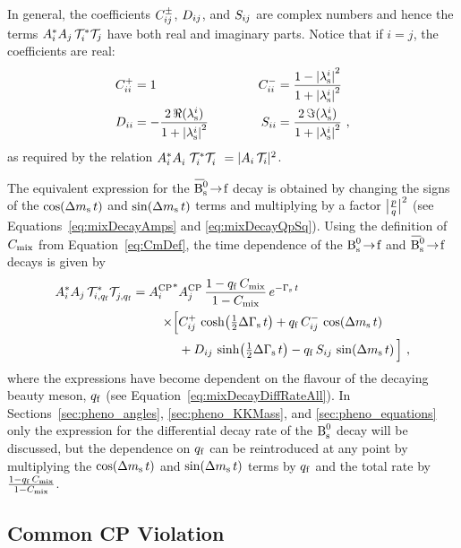 In general, the coefficients $\Cf[ij]^\pm$, $\Df[ij]$, and $\Sf[ij]$ are complex numbers and hence the terms
$\Ai^*\Ai[j]\,\timeAmp^*\timeAmp[j]$ have both real and imaginary parts. Notice that if $i=j$, the coefficients are real:
\begin{equation}
  \begin{alignedat}{2}
    \Cf[ii]^+ &= 1                                                    &  \Cf[ii]^- &= \frac{1-\lamsiSq}{1+\lamsiSq} \\
    \Df[ii]   &= -\frac{2\,\Re(\lamsi)}{1+\lamsiSq} \qquad\qquad  &  \Sf[ii]   &= \frac{2\,\Im(\lamsi)}{1+\lamsiSq} \ ,
  \end{alignedat}
\end{equation}
as required by the relation $\Ai^*\Ai^{\phantom{*}}\,\timeAmp^*\timeAmp^{\phantom{*}} = |\Ai\,\timeAmp|^2$.

The equivalent expression for the $\Bsbartof$ decay is obtained by changing the signs of the $\cDms$ and $\sDms$ terms and multiplying by a
factor $\pqAbsAlt^\text{2}$ (see Equations~\ref{eq:mixDecayAmps} and \ref{eq:mixDecayQpSq}). Using the definition of $\Cm$ from
Equation~\ref{eq:CmDef}, the time dependence of the $\Bstof$ and $\Bsbartof$ decays is given by
\begin{equation}
  \label{eq:timeqfDep}
  \begin{aligned}
    \Ai^*\Ai[j]\,\timeAmp[i,\qf]^*\timeAmp[j,\qf]^{\phantom{*}} =
      \AAvConj&\AAv[{\Ai[j]}]\, \frac{1-\qf\,\Cm}{1-\Cm}\, \eGst \\
          \times\Big[ &\Cf[ij]^+\,\cDGs + \qf\,\Cf[ij]^-\,\cDms \\
                      &+ \Df[ij]\,\sDGs - \qf\,\Sf[ij]\,\sDms \Big] \ ,
  \end{aligned}
\end{equation}
where the expressions have become dependent on the flavour of the decaying beauty meson, $\qf$ (see Equation~\ref{eq:mixDecayDiffRateAll}).
In Sections~\ref{sec:pheno_angles}, \ref{sec:pheno_KKMass}, and \ref{sec:pheno_equations} only the expression for the differential decay
rate of the $\Bs$ decay will be discussed, but the dependence on $\qf$ can be reintroduced at any point by multiplying the $\cDms$ and
$\sDms$ terms by $\qf$ and the total rate by $\frac{1-\qf\,\Cm}{1-\Cm}$.


\subsection{Common CP Violation}
\label{subsec:pheno_time_commonCPV}

